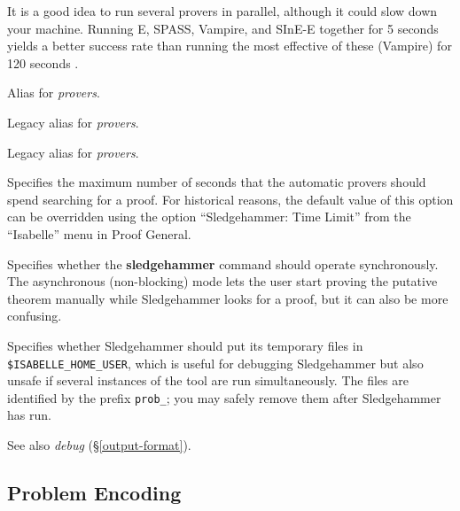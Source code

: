 \documentclass[a4paper,12pt]{article}
\begin{document}
\begin{enum}
It is a good idea to run several provers in parallel, although it could slow
down your machine. Running E, SPASS, Vampire, and SInE-E together for 5 seconds
yields a better success rate than running the most effective of these (Vampire)
for 120 seconds \cite{boehme-nipkow-2010}.

Alias for \textit{provers}.

Legacy alias for \textit{provers}.

Legacy alias for \textit{provers}.

Specifies the maximum number of seconds that the automatic provers should spend
searching for a proof. For historical reasons, the default value of this option
can be overridden using the option ``Sledgehammer: Time Limit'' from the
``Isabelle'' menu in Proof General.

Specifies whether the \textbf{sledgehammer} command should operate
synchronously. The asynchronous (non-blocking) mode lets the user start proving
the putative theorem manually while Sledgehammer looks for a proof, but it can
also be more confusing.

Specifies whether Sledgehammer should put its temporary files in
\texttt{\$ISA\-BELLE\_\allowbreak HOME\_\allowbreak USER}, which is useful for
debugging Sledgehammer but also unsafe if several instances of the tool are run
simultaneously. The files are identified by the prefix \texttt{prob\_}; you may
safely remove them after Sledgehammer has run.

\nopagebreak
{\small See also \textit{debug} (\S\ref{output-format}).}
\end{enum}

\subsection{Problem Encoding}
\label{problem-encoding}
\end{document}
